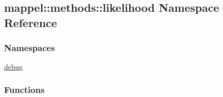 \hypertarget{namespacemappel_1_1methods_1_1likelihood}{}\subsection{mappel\+:\+:methods\+:\+:likelihood Namespace Reference}
\label{namespacemappel_1_1methods_1_1likelihood}
\subsubsection*{Namespaces}
\begin{DoxyCompactItemize}
\item 
 \hyperlink{namespacemappel_1_1methods_1_1likelihood_1_1debug}{debug}
\end{DoxyCompactItemize}
\subsubsection*{Functions}
